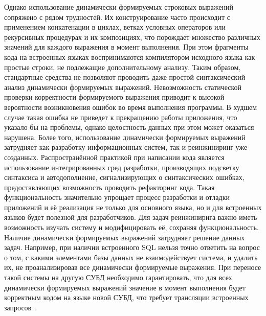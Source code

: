 Однако использование динамически формируемых строковых выражений сопряжено с рядом трудностей. Их конструирование часто происходит с применением конкатенации в циклах, ветках условных операторов или 
рекурсивных процедурах и их композициях, что порождает множество различных значений для каждого выражения в момент выполнения. При этом фрагменты кода на встроенных языках воспринимаются компилятором 
исходного языка как простые строки, не подлежащие дополнительному анализу. Таким образом, стандартные средства не позволяют проводить даже простой синтаксический анализ динамически формируемых выражений. 
Невозможность статической проверки корректности формируемого выражения приводит к высокой вероятности возникновения ошибок во время выполнения программы. В худшем случае такая ошибка не приведет к прекращению 
работы приложения, что указало бы на проблемы, однако целостность данных при этом может оказаться нарушена. Более того, использование динамически формируемых выражений затрудняет как разработку информационных 
систем, так и реинжиниринг уже созданных. Распространённой практикой при написании кода является использование интегрированных сред разработки, производящих подсветку синтаксиса и автодополнение, 
сигнализирующих о синтаксических ошибках, предоставляющих возможность проводить рефакторинг кода. Такая функциональность значительно упрощает процесс разработки и отладки приложений и её реализация не 
только для основного языка, но и для встроенных языков будет полезной для разработчиков. Для задач реинжинирига важно иметь возможность изучать систему и модифицировать её, сохраняя функциональность. 
Наличие динамически формируемых выражений затрудняет решение данных задач. Например, при наличии встроенного SQL нельзя точно ответить на вопрос о том, с какими элементами базы данных не взаимодействует система, 
и  удалить их, не проанализировав все динамически формируемые выражения. При переносе такой системы на другую СУБД необходимо гарантировать, что для всех динамически формируемых выражений значение в момент 
выполнения будет корректным кодом на языке новой СУБД, что требует трансляции встроенных запросов~\cite{Syrcose}. 


